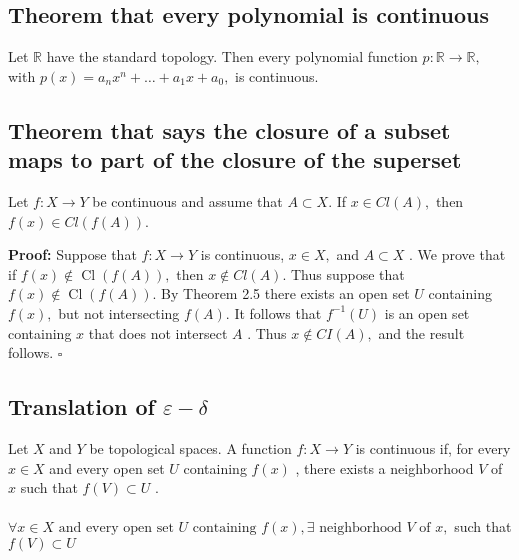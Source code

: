 \documentclass[12pt]{article}
\newenvironment{proofed}[1][]{\par \medskip \noindent \textbf{#1 Proof: }}{\hfill$\square$}
\begin{document}
		
	\subsection{Theorem that every polynomial is continuous}
		Let $\mathbb { R }$ have the standard topology. Then every polynomial
		function $p : \mathbb { R } \rightarrow \mathbb { R } ,$ with $p ( x ) = a _ { n } x ^ { n } + \ldots + a _ { 1 } x + a _ { 0 } ,$ is continuous.
		
	\subsection{Theorem that says the closure of a subset maps to part of the closure of the superset}
		Let $f : X \rightarrow Y$ be continuous and assume that $A \subset X .$ If
		$x \in C l ( A ) ,$ then $f ( x ) \in C l ( f ( A ) )$.
	\begin{proofed}
		Suppose that $f : X \rightarrow Y$ is continuous, $x \in X ,$ and $A \subset X$ .
		We prove that if $f ( x ) \notin \operatorname { Cl } ( f ( A ) ) ,$ then $x \notin C l ( A ) .$ Thus suppose that $f ( x ) \notin \operatorname { Cl } ( f ( A ) ) .$ By Theorem 2.5 there exists an open set $U$ containing
		$f ( x ) ,$ but not intersecting $f ( A ) .$ It follows that $f ^ { - 1 } ( U )$ is an open set
		containing $x$ that does not intersect $A$ . Thus $x \notin C I ( A ) ,$ and the result
		follows.
	\end{proofed}
		
	\subsection{Translation of $ \varepsilon - \delta $}
		Let $X$ and $Y$ be topological spaces. A function $f : X \rightarrow Y$ is continuous if, for every $x \in X$ and every open set $U$ containing $f ( x )$ , there exists a neighborhood $V$ of $x$ such that $f ( V ) \subset U$ .\\
		\\
		$ \forall x\in X \text{ and every open set } U \text{ containing } f(x), \exists \text{ neighborhood } V \text{ of } x,$ such that $ f(V)\subset U $
	
\end{document}
